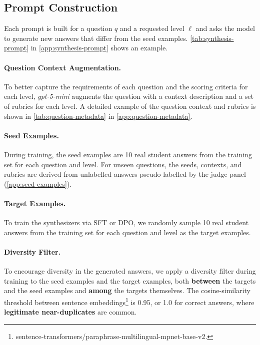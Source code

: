 \subsection{Prompt Construction}
\label{sec:prompt-construction}

Each prompt is built for a question $q$ and a requested level $\ell$ and asks the model to generate new answers that differ from the seed examples. \autoref{tab:synthesis-prompt} in \autoref{app:synthesis-prompt} shows an example.

\paragraph{Question Context Augmentation.}
To better capture the requirements of each question and the scoring criteria for each level, \textit{gpt-5-mini} augments the question with a context description and a set of rubrics for each level. A detailed example of the question context and rubrics is shown in \autoref{tab:question-metadata} in \autoref{app:question-metadata}.

\paragraph{Seed Examples.}
During training, the seed examples are 10 real student answers from the training set for each question and level. For unseen questions, the seeds, contexts, and rubrics are derived from unlabelled answers pseudo-labelled by the judge panel (\autoref{app:seed-examples}).

\paragraph{Target Examples.}
To train the synthesizers via SFT or DPO, we randomly sample 10 real student answers from the training set for each question and level as the target examples.

\paragraph{Diversity Filter.}
To encourage diversity in the generated answers, we apply a diversity filter during training to the seed examples and the target examples, both \textbf{between} the targets and the seed examples and \textbf{among} the targets themselves. The cosine-similarity threshold between sentence embeddings\footnote{sentence-transformers/paraphrase-multilingual-mpnet-base-v2.} is 0.95, or 1.0 for correct answers, where \textbf{legitimate near-duplicates} are common.



